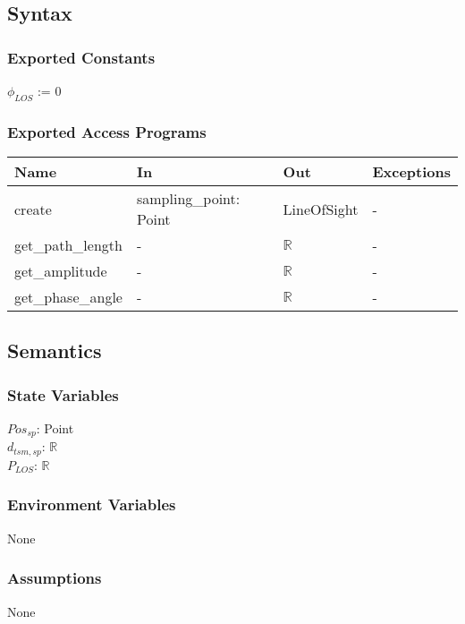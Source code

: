 \documentclass[12pt, titlepage]{article}
\begin{document}
\subsection{Syntax}

\subsubsection{Exported Constants}

$\phi_{LOS}$ := 0

\subsubsection{Exported Access Programs}

\begin{center}
\begin{tabular}{p{4cm} p{3cm} p{3cm} p{4cm}}
\hline
\textbf{Name} & \textbf{In} & \textbf{Out} & \textbf{Exceptions} \\
\hline
create & sampling\_point: Point & LineOfSight & - \\
get\_path\_length & - & $\mathbb{R}$ & - \\
get\_amplitude & - & $\mathbb{R}$ & - \\
get\_phase\_angle & - & $\mathbb{R}$ & - \\
\hline
\end{tabular}
\end{center}

\subsection{Semantics}

\subsubsection{State Variables} 
$Pos_{sp}$: Point\\
$d_{tsm,sp}$: $\mathbb{R}$\\
$P_{LOS}$: $\mathbb{R}$

\subsubsection{Environment Variables} None

\subsubsection{Assumptions} None
\end{document}
